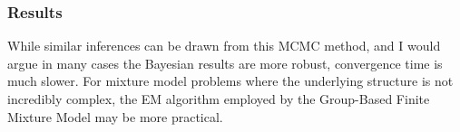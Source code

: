 \documentclass{article}
\begin{document}
    \subsubsection{Results}\label{results}

While similar inferences can be drawn from this MCMC method, and I would
argue in many cases the Bayesian results are more robust, convergence
time is much slower. For mixture model problems where the underlying
structure is not incredibly complex, the EM algorithm employed by the
Group-Based Finite Mixture Model may be more practical.


    
    
    
    
\end{document}
